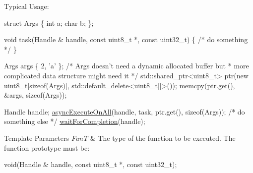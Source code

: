 Typical Usage\-: 
\begin{DoxyCode}
\textcolor{keyword}{struct }Args \{
  \textcolor{keywordtype}{int} a;
  \textcolor{keywordtype}{char} b;
\};

\textcolor{keywordtype}{void} task(Handle & handle, \textcolor{keyword}{const} uint8\_t *,
                           \textcolor{keyword}{const} uint32\_t) \{  \textcolor{comment}{/* do something */} \}

Args args \{ 2, \textcolor{charliteral}{'a'} \};
\textcolor{comment}{/* Args doesn't need a dynamic allocated buffer but}
\textcolor{comment}{ * more complicated data structure might need it */}
std::shared\_ptr<uint8\_t> ptr(\textcolor{keyword}{new} uint8\_t[\textcolor{keyword}{sizeof}(Args)],
                             std::default\_delete<uint8\_t[]>());
memcpy(ptr.get(), &args, \textcolor{keyword}{sizeof}(Args));

Handle handle;
\hyperlink{namespaceshad_1_1rt_a35ae5113d8da4942705af0a77305fe0c}{asyncExecuteOnAll}(handle, task, ptr.get(), \textcolor{keyword}{sizeof}(Args));
\textcolor{comment}{/* do something else */}
\hyperlink{namespaceshad_1_1rt_a6ea1d3672bac3a80032863b6732a0c0a}{waitForCompletion}(handle);
\end{DoxyCode}



\begin{DoxyTemplParams}{Template Parameters}
{\em Fun\-T} & The type of the function to be executed. The function prototype must be\-: 
\begin{DoxyCode}
void(Handle & handle, \textcolor{keyword}{const} uint8\_t *, \textcolor{keyword}{const} uint32\_t);
\end{DoxyCode}
\\
\hline
\end{DoxyTemplParams}

